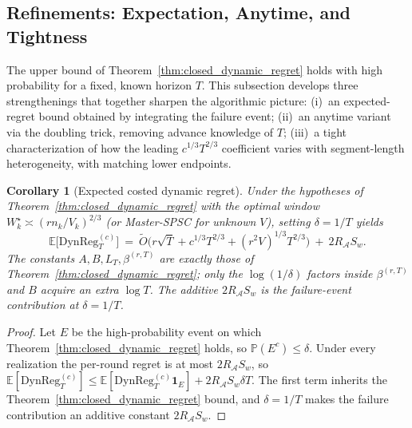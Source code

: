 \documentclass[11pt]{article}
\newcommand{\E}{\mathbb{E}}
\newcommand{\Prob}{\mathbb{P}}
\newcommand{\cA}{\mathcal{A}}
\newcommand{\DynReg}{\mathrm{DynReg}}
\newtheorem{corollary}{Corollary}
\begin{document}
\subsection{Refinements: Expectation, Anytime, and Tightness}
\label{sec:refinements}

The upper bound of Theorem~\ref{thm:closed_dynamic_regret} holds with high
probability for a fixed, known horizon $T$.  This subsection develops three
strengthenings that together sharpen the algorithmic picture: (i)~an
expected-regret bound obtained by integrating the failure event;
(ii)~an anytime variant via the doubling trick, removing advance knowledge
of $T$; (iii)~a tight characterization of how the leading $c^{1/3}T^{2/3}$
coefficient varies with segment-length heterogeneity, with matching lower
endpoints.

\begin{corollary}[Expected costed dynamic regret]
\label{cor:expected_regret}
Under the hypotheses of Theorem~\ref{thm:closed_dynamic_regret} with the
optimal window $W_k^\star\asymp(rn_k/V_k)^{2/3}$ (or Master-SPSC for unknown
$V$), setting $\delta=1/T$ yields
\[
  \E\bigl[\DynReg_T^{(c)}\bigr]
  \ =\ \widetilde O\!\bigl(r\sqrt T+c^{1/3}T^{2/3}+(r^2V)^{1/3}T^{2/3}\bigr)
    \ +\ 2R_{\cA}S_w.
\]
The constants $A,B,L_T,\beta^{(r,T)}$ are exactly those of
Theorem~\ref{thm:closed_dynamic_regret}; only the $\log(1/\delta)$ factors
inside $\beta^{(r,T)}$ and $B$ acquire an extra $\log T$.  The additive
$2R_{\cA}S_w$ is the failure-event contribution at $\delta=1/T$.
\end{corollary}

\begin{proof}
Let $E$ be the high-probability event on which
Theorem~\ref{thm:closed_dynamic_regret} holds, so $\Prob(E^c)\le\delta$.
Under every realization the per-round regret is at most
$2R_{\cA}S_w$, so
$\E[\DynReg_T^{(c)}]\le\E[\DynReg_T^{(c)}\mathbf 1_E]+2R_{\cA}S_w\delta T$.
The first term inherits the Theorem~\ref{thm:closed_dynamic_regret} bound,
and $\delta=1/T$ makes the failure contribution an additive constant
$2R_{\cA}S_w$.
\end{proof}
\end{document}
